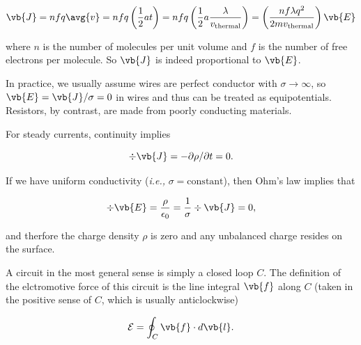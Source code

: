 \documentclass[english,a4paper,12pt]{report}
\begin{document}
\begin{equation}
    \vb{J} = nfq\avg{v} = nfq \left( \frac{1}{2}at \right) = nfq \left( \frac{1}{2}a\frac{\lambda}{v_{\text{thermal} } }  \right) = \left( \frac{nf\lambda q^2}{2mv_{\text{thermal} } }  \right) \vb{E}  
\end{equation}

where \(n\) is the number of molecules per unit volume and \(f\) is the number of free electrons per molecule. So \(\vb{J} \) is indeed proportional to \(\vb{E} \).  

In practice, we usually assume wires are perfect conductor with \(\sigma \rightarrow \infty\), so \(\vb{E} = \vb{J} /\sigma  =0\) in wires and thus can be treated as equipotentials. Resistors, by contrast, are made from poorly conducting materials. 

For steady currents, continuity implies

\begin{equation}
    \div{\vb{J} } = - \partial \rho /\partial t = 0.
\end{equation}

If we have uniform conductivity (\textit{i.e.,} \(\sigma = \text{constant}  \)), then Ohm's law implies that 

\begin{equation}
    \div{\vb{E} } = \frac{\rho }{\epsilon_0 } = \frac{1}{\sigma } \div{\vb{J} } = 0, 
\end{equation}

and therfore the charge density \(\rho \) is zero and any unbalanced charge resides on the surface.


A circuit in the most general sense is simply a closed loop \(C\). The definition of the elctromotive force of this circuit is the line integral \(\vb{f} \) along \(C\) (taken in the positive sense of \(C\), which is usually anticlockwise)  

\begin{equation}
    \mathcal{E} = \oint_{C}  \vb{f} \cdot d \vb{l} .
\end{equation}

\begin{center}
\end{center}
\end{document}
